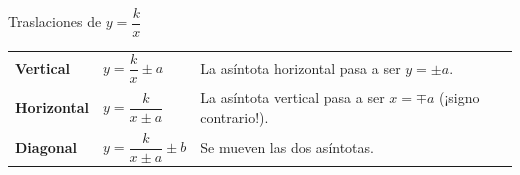 \documentclass[11pt,a4paper]{article}
\makeatletter
\newcommand{\fmm}[1]{\setbox0=\hbox{$#1$}\ifdim\wd0>0.8\linewidth\def\fmmnext{\fmmdisp{#1}}\else\def\fmmnext{\mbox{\box0}}\fi\fmmnext}
\def\fmmdisp#1{\@ifnextchar.{\fmmdispp{#1}}{\@ifnextchar,{\fmmdispc{#1}}{\@ifnextchar;{\fmmdisps{#1}}{\fmdisp{#1}}}}}
\def\fmmdispp#1.{\fmdisp{#1\,.}}\def\fmmdispc#1,{\fmdisp{#1\,,}}\def\fmmdisps#1;{\fmdisp{#1\,;}}
\newcommand{\fmdisp}[1]{\[\setbox2=\hbox{$\displaystyle #1$}\ifdim\wd2>\linewidth\resizebox{\linewidth}{!}{\box2}\else\box2\fi\]}
\makeatother
\begin{document}
\begin{fmprop}{Traslaciones de $y=\dfrac kx$}

\begin{center}\renewcommand{\arraystretch}{1.5}\small\begin{tabularx}{\linewidth}{>{\raggedright\arraybackslash}p{3.2cm}>{\raggedright\arraybackslash}X>{\raggedright\arraybackslash}X}\toprule
\textbf{Vertical} & $y=\dfrac kx\pm a$ & La asíntota horizontal pasa a ser $y=\pm a$.\\[3pt]
\textbf{Horizontal} & $y=\dfrac k{x\pm a}$ & La asíntota vertical pasa a ser $x=\mp a$ (¡signo contrario!).\\[3pt]
\textbf{Diagonal} & $y=\dfrac k{x\pm a}\pm b$ & Se mueven las dos asíntotas.\\[3pt]
\bottomrule\end{tabularx}\end{center}


\end{fmprop}
\end{document}
